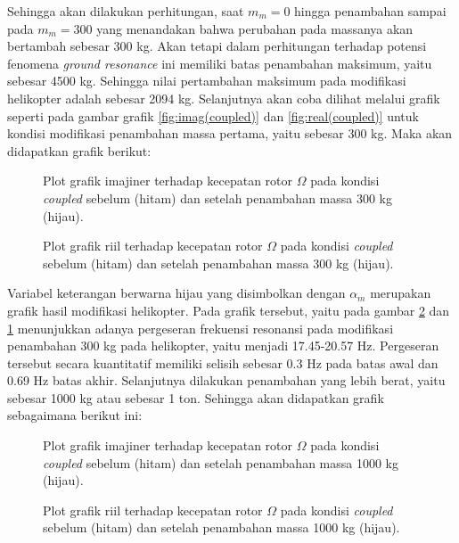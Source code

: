 Sehingga akan dilakukan perhitungan, saat $m_m = 0$ hingga penambahan sampai pada $m_m = 300$ yang menandakan bahwa perubahan pada massanya akan bertambah sebesar 300 kg. Akan tetapi dalam perhitungan terhadap potensi fenomena \textit{ground resonance} ini memiliki batas penambahan maksimum, yaitu sebesar 4500 kg. Sehingga nilai pertambahan maksimum pada modifikasi helikopter adalah sebesar 2094 kg. Selanjutnya akan coba dilihat melalui grafik seperti pada gambar grafik \ref{fig:imag(coupled)} dan \ref{fig:real(coupled)} untuk kondisi modifikasi penambahan massa pertama, yaitu sebesar 300 kg. Maka akan didapatkan grafik berikut:

\begin{figure}[H]
	\centering
	\caption{Plot grafik imajiner terhadap kecepatan rotor $\Omega$ pada kondisi \textit{coupled} sebelum (hitam) dan setelah penambahan massa 300 kg (hijau).}
	\label{fig:imag(modified)_1}
\end{figure}

\begin{figure}[H]
	\centering
	\caption{Plot grafik riil terhadap kecepatan rotor $\Omega$ pada kondisi \textit{coupled} sebelum (hitam) dan setelah penambahan massa 300 kg (hijau).}
	\label{fig:real(modified)_1}
\end{figure}

Variabel keterangan berwarna hijau yang disimbolkan dengan $\alpha_m$ merupakan grafik hasil modifikasi helikopter.  Pada grafik tersebut, yaitu pada gambar \ref{fig:real(modified)_1} dan \ref{fig:imag(modified)_1} menunjukkan adanya pergeseran frekuensi resonansi pada modifikasi penambahan 300 kg pada helikopter, yaitu menjadi 17.45-20.57 Hz. Pergeseran tersebut secara kuantitatif memiliki selisih sebesar 0.3 Hz pada batas awal dan 0.69 Hz batas akhir. Selanjutnya dilakukan penambahan yang lebih berat, yaitu sebesar 1000 kg atau sebesar 1 ton. Sehingga akan didapatkan grafik sebagaimana berikut ini:

\begin{figure}[H]
	\centering
	\caption{Plot grafik imajiner terhadap kecepatan rotor $\Omega$ pada kondisi \textit{coupled} sebelum (hitam) dan setelah penambahan massa 1000 kg (hijau).}
	\label{fig:imag(modified)_2}
\end{figure}

\begin{figure}[H]
	\centering
	\caption{Plot grafik riil terhadap kecepatan rotor $\Omega$ pada kondisi \textit{coupled} sebelum (hitam) dan setelah penambahan massa 1000 kg (hijau).}
	\label{fig:real(modified)_2}
\end{figure}

